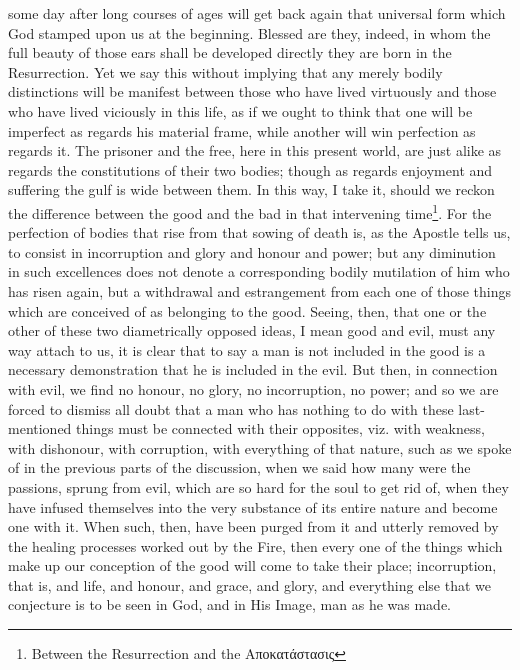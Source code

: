 some day after long courses of ages will get back again that universal form which God stamped upon us at the beginning. Blessed are they, indeed, in whom the full beauty of those ears shall be developed directly they are born in the Resurrection. Yet we say this without implying that any merely bodily distinctions will be manifest between those who have lived virtuously and those who have lived viciously in this life, as if we ought to think that one will be imperfect as regards his material frame, while another will win perfection as regards it. The prisoner and the free, here in this present world, are just alike as regards the constitutions of their two bodies; though as regards enjoyment and suffering the gulf is wide between them. In this way, I take it, should we reckon the difference between the good and the bad in that intervening time\footnote{Between the Resurrection and the \textgreek{Αποκατάστασις}}. For the perfection of bodies that rise from that sowing of death is, as the Apostle tells us, to consist in incorruption and glory and honour and power; but any diminution in such excellences does not denote a corresponding bodily mutilation of him who has risen again, but a withdrawal and estrangement from each one of those things which are conceived of as belonging to the good. Seeing, then, that one or the other of these two diametrically opposed ideas, I mean good and evil, must any way attach to us, it is clear that to say a man is not included in the good is a necessary demonstration that he is included in the evil. But then, in connection with evil, we find no honour, no glory, no incorruption, no power; and so we are forced to dismiss all doubt that a man who has nothing to do with these last-mentioned things must be connected with their opposites, viz. with weakness, with dishonour, with corruption, with everything of that nature, such as we spoke of in the previous parts of the discussion, when we said how many were the passions, sprung from evil, which are so hard for the soul to get rid of, when they have infused themselves into the very substance of its entire nature and become one with it. When such, then, have been purged from it and utterly removed by the healing processes worked out by the Fire, then every one of the things which make up our conception of the good will come to take their place; incorruption, that is, and life, and honour, and grace, and glory, and everything else that we conjecture is to be seen in God, and in His Image, man as he was made.
